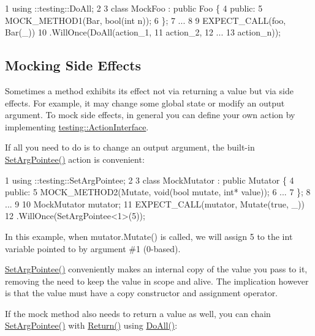 \begin{DoxyCode}
1 using ::testing::DoAll;
2 
3 class MockFoo : public Foo \{
4  public:
5   MOCK\_METHOD1(Bar, bool(int n));
6 \};
7 ...
8 
9   EXPECT\_CALL(foo, Bar(\_))
10       .WillOnce(DoAll(action\_1,
11                       action\_2,
12                       ...
13                       action\_n));
\end{DoxyCode}


\subsection*{Mocking Side Effects}

Sometimes a method exhibits its effect not via returning a value but via side effects. For example, it may change some global state or modify an output argument. To mock side effects, in general you can define your own action by implementing {\ttfamily \hyperlink{classtesting_1_1ActionInterface}{testing\+::\+Action\+Interface}}.

If all you need to do is to change an output argument, the built-\/in {\ttfamily \hyperlink{namespacetesting_a5740a5033b88c37666fcd09a269d123f}{Set\+Arg\+Pointee()}} action is convenient\+:


\begin{DoxyCode}
1 using ::testing::SetArgPointee;
2 
3 class MockMutator : public Mutator \{
4  public:
5   MOCK\_METHOD2(Mutate, void(bool mutate, int* value));
6   ...
7 \};
8 ...
9 
10   MockMutator mutator;
11   EXPECT\_CALL(mutator, Mutate(true, \_))
12       .WillOnce(SetArgPointee<1>(5));
\end{DoxyCode}


In this example, when {\ttfamily mutator.\+Mutate()} is called, we will assign 5 to the {\ttfamily int} variable pointed to by argument \#1 (0-\/based).

{\ttfamily \hyperlink{namespacetesting_a5740a5033b88c37666fcd09a269d123f}{Set\+Arg\+Pointee()}} conveniently makes an internal copy of the value you pass to it, removing the need to keep the value in scope and alive. The implication however is that the value must have a copy constructor and assignment operator.

If the mock method also needs to return a value as well, you can chain {\ttfamily \hyperlink{namespacetesting_a5740a5033b88c37666fcd09a269d123f}{Set\+Arg\+Pointee()}} with {\ttfamily \hyperlink{namespacetesting_af6d1c13e9376c77671e37545cd84359c}{Return()}} using {\ttfamily \hyperlink{namespacetesting_a5f533932753d2af95000e96c4a3042e3}{Do\+All()}}\+:


